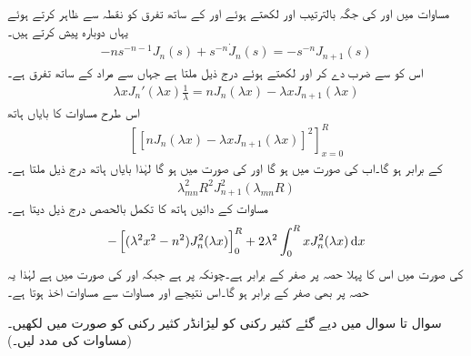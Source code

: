 مساوات  میں  اور  کی جگہ بالترتیب  اور  لکھتے ہوئے اور  کے ساتھ تفرق کو نقطہ سے ظاہر کرتے ہوئے یہاں دوبارہ پیش کرتے ہیں۔
\begin{align*}
-ns^{-n-1}J_n(s)+s^{-n}\dot{J}_n(s)=-s^{-n}J_{n+1}(s)
\end{align*}
اس کو  سے ضرب دے کر اور  لکھتے ہوئے درج ذیل ملتا ہے جہاں  سے مراد  کے ساتھ تفرق ہے۔
\begin{align*}
\lambda x J_n'(\lambda x)\frac{1}{\lambda}=nJ_n(\lambda x)-\lambda x J_{n+1}(\lambda x)
\end{align*}
اس طرح مساوات  کا بایاں ہاتھ 
\begin{align*}
\left[[nJ_n(\lambda x)-\lambda x J_{n+1}(\lambda x)]^2\right]_{x=0}^R
\end{align*}
کے برابر ہو گا۔اب  کی صورت میں  ہو گا اور  کی صورت میں  ہو گا  لہٰذا بایاں ہاتھ درج ذیل ملتا ہے۔
\begin{align}\label{مساوات_طاقتی_فوریئر_بیسل_ت}
\lambda^2_{mn} R^2J^2_{n+1}(\lambda_{mn}R)
\end{align}
مساوات  کے دائیں ہاتھ کا تکمل بالحصص درج ذیل دیتا ہے۔
\begin{align}
-\left[(\lambda^2x^2-n^2)J^2_n(\lambda x)\right]_0^R+2\lambda^2\int_0^R xJ^2_n(\lambda x)\dif x
\end{align}
 کی صورت میں اس کا پہلا حصہ  پر صفر کے برابر ہے۔چونکہ  پر  ہے جبکہ   اور   کی صورت میں  ہے لہٰذا یہ حصہ  پر بھی صفر کے برابر ہو گا۔اس نتیجے اور مساوات  سے مساوات  اخذ ہوتا ہے۔


سوال  تا سوال  میں دیے گئے کثیر رکنی کو لیژانڈر کثیر رکنی کو صورت میں لکھیں۔(مساوات  کی مدد لیں۔)

